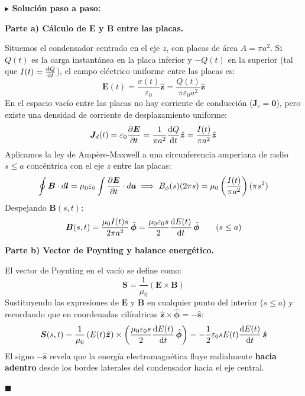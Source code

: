 \documentclass[11pt,a4paper]{book}
\newenvironment{solucion}{%
    \par\medskip\noindent\textbf{\color{blue!65!black}\Large $\blacktriangleright$ Solución paso a paso:}\par\medskip
}{%
    \hfill$\blacksquare$\par\bigskip
}
\newcommand{\phihat}{\hat{\bm{\phi}}}
\newcommand{\shat}{\hat{\bm{s}}}
\newcommand{\zhat}{\hat{\bm{z}}}
\newcommand{\Evec}{\bm{E}}
\newcommand{\Bvec}{\bm{B}}
\newcommand{\Jvec}{\bm{J}}
\newcommand{\Svec}{\bm{S}}
\begin{document}
\begin{solucion}
\textbf{Parte a) Cálculo de $\Evec$ y $\Bvec$ entre las placas.}

Situemos el condensador centrado en el eje $z$, con placas de área $A = \pi a^2$. Si $Q(t)$ es la carga instantánea en la placa inferior y $-Q(t)$ en la superior (tal que $I(t) = \dv{Q}{t}$), el campo eléctrico uniforme entre las placas es:
\begin{equation}
    \Evec(t) = \frac{\sigma(t)}{\varepsilon_0}\zhat = \frac{Q(t)}{\pi \varepsilon_0 a^2}\zhat
\end{equation}
En el espacio vacío entre las placas no hay corriente de conducción ($\Jvec_c = \bm{0}$), pero existe una densidad de corriente de desplazamiento uniforme:
\begin{equation}
    \Jvec_d(t) = \varepsilon_0 \pdv{\Evec}{t} = \frac{1}{\pi a^2}\dv{Q}{t}\zhat = \frac{I(t)}{\pi a^2}\zhat
\end{equation}
Aplicamos la ley de Ampère-Maxwell a una circunferencia amperiana de radio $s \le a$ concéntrica con el eje $z$ entre las placas:
\begin{equation}
    \oint \Bvec \cdot d\bm{l} = \mu_0 \varepsilon_0 \int \pdv{\Evec}{t} \cdot d\bm{a} \implies B_\phi(s) (2\pi s) = \mu_0 \left(\frac{I(t)}{\pi a^2}\right) (\pi s^2)
\end{equation}
Despejando $\Bvec(s,t)$:
\begin{equation}
    \Bvec(s,t) = \frac{\mu_0 I(t) s}{2\pi a^2}\,\phihat = \frac{\mu_0 \varepsilon_0 s}{2} \dv{E(t)}{t}\,\phihat \qquad (s \le a)
\end{equation}

\medskip
\textbf{Parte b) Vector de Poynting y balance energético.}

El vector de Poynting en el vacío se define como:
\begin{equation}
    \Svec = \frac{1}{\mu_0} (\Evec \times \Bvec)
\end{equation}
Sustituyendo las expresiones de $\Evec$ y $\Bvec$ en cualquier punto del interior ($s \le a$) y recordando que en coordenadas cilíndricas $\zhat \times \phihat = -\shat$:
\begin{equation}
    \Svec(s,t) = \frac{1}{\mu_0} \left( E(t)\zhat \right) \times \left( \frac{\mu_0 \varepsilon_0 s}{2} \dv{E(t)}{t}\,\phihat \right) = -\frac{1}{2}\varepsilon_0 s E(t) \dv{E(t)}{t}\,\shat
\end{equation}
El signo $-\shat$ revela que la energía electromagnética fluye radialmente \textbf{hacia adentro} desde los bordes laterales del condensador hacia el eje central.


\end{solucion}
\end{document}
